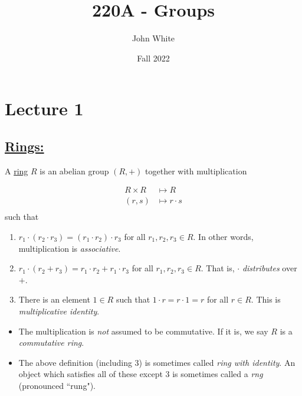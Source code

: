 \documentclass[x11names,reqno,14pt]{extarticle}
\title{220A - Groups}
\author{John White}
\date{Fall 2022}
\begin{document}
\section*{Lecture 1}

\subsection*{\underline{Rings:}}


A \underline{ring} $R$ is an abelian group $(R, +)$ together with multiplication

\begin{align*}
R\times R & \mapsto R \\
(r, s) & \mapsto r\cdot s \\ 
\end{align*}
such that
\begin{enumerate}
\item $r_1\cdot(r_2\cdot r_3) = (r_1\cdot r_2)\cdot r_3$ for all $r_1, r_2, r_3 \in R$. In other words, multiplication is \textit{associative}.
\item $r_1 \cdot(r_2 + r_3) = r_1\cdot r_2 + r_1\cdot r_3$ for all $r_1, r_2, r_3 \in R$. That is, $\cdot$ \textit{distributes} over $+$. 
\item There is an element $1 \in R$ such that $1\cdot r = r \cdot 1 = r$ for all $r \in R$. This is \textit{multiplicative identity}. 
\end{enumerate}

\rem
\begin{itemize}
\item The multiplication is \textit{not} assumed to be commutative. If it is, we say $R$ is a \textit{commutative ring}. 
\item The above definition (including 3) is sometimes called \textit{ring with identity}. An object which satisfies all of these except 3 is sometimes called a \textit{rng} (pronounced ``rung"). 
\end{itemize}

\exm
\end{document}
